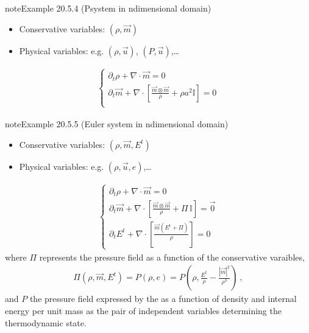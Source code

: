 \documentclass[letterpaper,10pt,english]{jupyterBook}
\begin{document}
\label{ch/pde/hyperbolic:example-7}
\begin{sphinxadmonition}{note}{Example 20.5.4 (P\sphinxhyphen{}system in n\sphinxhyphen{}dimensional domain)}


\begin{itemize}
\item {} 
\sphinxAtStartPar
Conservative variables: \((\rho, \vec{m})\)

\item {} 
\sphinxAtStartPar
Physical variables: e.g. \((\rho, \vec{u})\), \((P, \vec{u})\),…

\end{itemize}
\begin{equation*}
\begin{split}\begin{cases}
  \partial_t \rho + \nabla \cdot \vec{m} = 0 \\
  \partial_t \vec{m} + \nabla \cdot \left[ \frac{\vec{m}\otimes\vec{m}}{\rho} + \rho a^2 \mathbb{I} \right] = 0 \\
\end{cases}\end{split}
\end{equation*}\end{sphinxadmonition}
\label{ch/pde/hyperbolic:example-8}
\begin{sphinxadmonition}{note}{Example 20.5.5 (Euler system in n\sphinxhyphen{}dimensional domain)}


\begin{itemize}
\item {} 
\sphinxAtStartPar
Conservative variables: \((\rho, \vec{m}, E^t)\)

\item {} 
\sphinxAtStartPar
Physical variables: e.g. \((\rho, \vec{u}, e)\),…

\end{itemize}
\begin{equation*}
\begin{split}\begin{cases}
  \partial_t \rho + \nabla \cdot \vec{m} = 0 \\
  \partial_t \vec{m} + \nabla \cdot \left[ \frac{\vec{m}\otimes\vec{m}}{\rho} + \Pi \, \mathbb{I} \right] = \vec{0} \\
  \partial_t E^t + \nabla \cdot \left[ \frac{\vec{m} (E^t + \Pi)}{\rho} \right] = 0
\end{cases}\end{split}
\end{equation*}
\sphinxAtStartPar
where \(\Pi\) represents the pressure field as a function of the conservative varaibles,
\begin{equation*}
\begin{split}\Pi\left(\rho, \vec{m}, E^t\right) = P\left( \rho, e\right) = P\left( \rho, \frac{E^t}{\rho}-\frac{|\vec{m}|^2}{\rho^3}  \right) \ ,\end{split}
\end{equation*}
\sphinxAtStartPar
and \(P\) the pressure field expressed by the  as a function of density and internal energy per unit mass as the pair of independent variables determining the thermodynamic state.
\end{sphinxadmonition}
\end{document}
